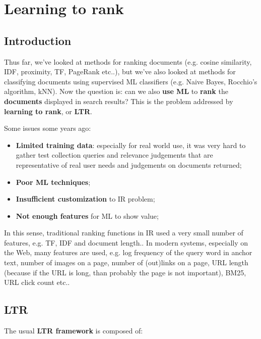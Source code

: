 \section{Learning to rank}
\subsection{Introduction}
Thus far, we've looked at methods for ranking documents (e.g. cosine similarity, IDF, proximity, TF, PageRank etc..), but we've also looked at methods for classifying documents using supervised ML classifiers (e.g. Naive Bayes, Rocchio's algorithm, kNN). Now the question is: can we also \textbf{use ML} to \textbf{rank} the \textbf{documents} displayed in search results? This is the problem addressed by \textbf{learning to rank}, or \textbf{LTR}.

Some issues some years ago:

\begin{itemize}
    \item \textbf{Limited training data}: especially for real world use, it was very hard to gather test collection queries and relevance judgements that are representative of real user needs and judgements on documents returned;
    \item \textbf{Poor ML techniques};
    \item \textbf{Insufficient customization} to IR problem;
    \item \textbf{Not enough features} for ML to show value;
\end{itemize}

In this sense, traditional ranking functions in IR used a very small number of features, e.g. TF, IDF and document length.. In modern systems, especially on the Web, many features are used, e.g. log frequency of the query word in anchor text, number of images on a page, number of (out)links on a page, URL length (because if the URL is long, than probably the page is not important), BM25, URL click count etc..

\subsection{LTR}
The usual \textbf{LTR framework} is composed of:

